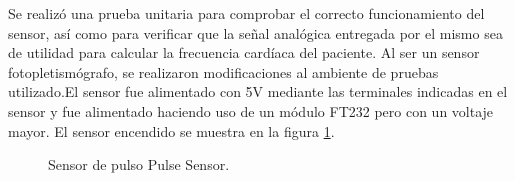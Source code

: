 %
%
%

Se realizó una prueba unitaria para comprobar el correcto funcionamiento del sensor, así como para verificar que la señal analógica entregada por el mismo sea de utilidad para calcular la frecuencia cardíaca del paciente. Al ser un sensor fotopletismógrafo, se realizaron modificaciones al ambiente de pruebas utilizado.El sensor fue alimentado con 5V mediante las terminales indicadas en el sensor y fue alimentado haciendo uso de un módulo FT232 pero con un voltaje mayor. El sensor encendido se muestra en la figura \ref{fig:PulseSensor2}.\\

\begin{figure}[htbp!]
	\centering
	\caption{Sensor de pulso Pulse Sensor.}
	\label{fig:PulseSensor2}
\end{figure}

